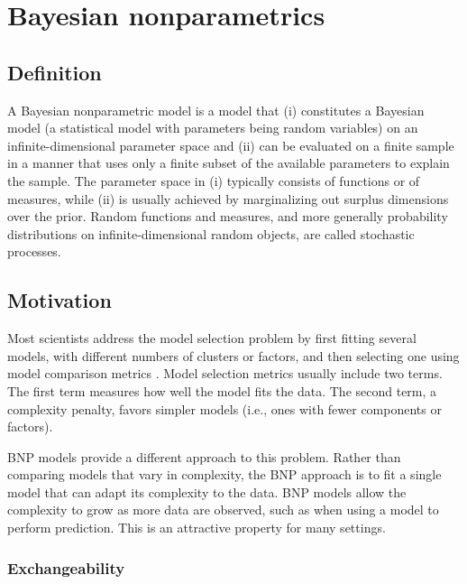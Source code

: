 
\chapter{Bayesian nonparametrics}

\section{Definition} \label{BNP_def}
A Bayesian nonparametric model is a model that (i) constitutes a Bayesian model (a statistical model with parameters being random variables) on an infinite-dimensional parameter space and (ii) can be evaluated on a finite sample in a manner that uses only a finite subset of the available parameters to explain the sample.
The parameter space in (i) typically consists of functions or of measures, while (ii) is usually achieved by marginalizing out surplus dimensions over the prior. Random functions and measures, and more generally probability distributions on infinite-dimensional random objects, are called stochastic processes.


\section{Motivation}
Most scientists address the model selection problem by first fitting several models, with different numbers of clusters or factors, and then selecting one using model comparison metrics \cite{Claeskens:1251912}. Model selection metrics usually include two terms. The first term measures how well the model fits the data. The second term, a complexity penalty, favors simpler models (i.e., ones with fewer components or factors).

\gls{BNP} models provide a different approach to this problem. Rather than comparing models that vary in complexity, the \gls{BNP} approach is to fit a single model that can adapt its complexity to the data. \gls{BNP} models allow the complexity to grow as more data are observed, such as when using a model to perform prediction. This is an attractive property for many settings.


\subsection{Exchangeability}

